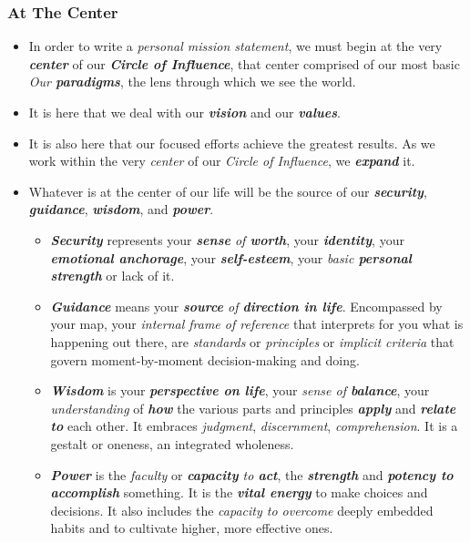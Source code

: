\documentclass[11pt]{article}
\begin{document}
\subsubsection{At The Center}
\begin{itemize}
\item In order to write a \emph{personal mission statement}, we must begin at the very \emph{\textbf{center}} of our \emph{\textbf{Circle of Influence}}, that center comprised of our most basic \emph{Our \textbf{paradigms}}, the lens through which we see the world.

\item It is here that we deal with our \emph{\textbf{vision}} and our \emph{\textbf{values}}. 

\item It is also here that our focused efforts achieve the greatest results. As we work within the very \emph{center} of our \emph{Circle of Influence}, we \emph{\textbf{expand}} it.

\item Whatever is at the center of our life will be the source of our \emph{\textbf{security}}, \emph{\textbf{guidance}}, \emph{\textbf{wisdom}}, and \emph{\textbf{power}}.
\begin{itemize}
\item \emph{\textbf{Security}} represents your \emph{\textbf{sense} of \textbf{worth}}, your \emph{\textbf{identity}}, your \emph{\textbf{emotional anchorage}}, your \emph{\textbf{self-esteem}}, your \emph{basic \textbf{personal strength}} or lack of it.
\item \emph{\textbf{Guidance}} means your \emph{\textbf{source} of \textbf{direction in life}}. Encompassed by your map, your \emph{internal frame of reference} that interprets for you what is happening out there, are \emph{standards} or \emph{principles} or \emph{implicit criteria} that govern moment-by-moment decision-making and doing.
\item \emph{\textbf{Wisdom}} is your \emph{\textbf{perspective on life}}, your \emph{sense of \textbf{balance}}, your \emph{understanding} of \emph{\textbf{how}} the various parts and principles \emph{\textbf{apply}} and \emph{\textbf{relate to}} each other. It embraces \emph{judgment}, \emph{discernment}, \emph{comprehension}. It is a gestalt or oneness, an integrated wholeness.
\item \emph{\textbf{Power}} is the \emph{faculty} or \emph{\textbf{capacity} to \textbf{act}}, the \emph{\textbf{strength}} and \emph{\textbf{potency to accomplish}} something. It is the \emph{\textbf{vital energy}} to make choices and decisions. It also includes the \emph{capacity to overcome} deeply embedded habits and to cultivate higher, more effective ones.
\end{itemize}


\end{itemize}
\end{document}
